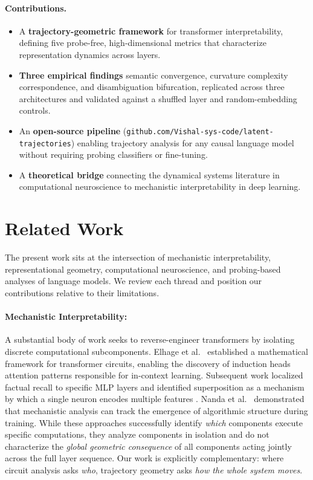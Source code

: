 \documentclass{article}
\begin{document}
\paragraph{Contributions.}
\begin{itemize}
    \item A \textbf{trajectory-geometric framework} for transformer 
    interpretability, defining five probe-free, high-dimensional metrics that 
    characterize representation dynamics across layers.
    
    \item \textbf{Three empirical findings} semantic convergence, 
    curvature complexity correspondence, and disambiguation bifurcation, replicated across three architectures and validated against a shuffled layer and random-embedding controls.
    
    \item An \textbf{open-source pipeline} (\texttt{github.com/Vishal-sys-code/latent-trajectories}) enabling trajectory analysis for any causal language model without requiring probing classifiers or fine-tuning.
    
    \item A \textbf{theoretical bridge} connecting the dynamical systems 
    literature in computational neuroscience to mechanistic interpretability 
    in deep learning.
\end{itemize}


\section{Related Work}
\label{sec:related_work}
The present work sits at the intersection of mechanistic interpretability, representational geometry, computational neuroscience, and probing-based analyses of language models. We review each thread and position our contributions relative to their limitations.

\paragraph{Mechanistic Interpretability:} A substantial body of work seeks to reverse-engineer transformers by isolating discrete computational subcomponents. Elhage et al.\ \cite{elhage2021mathematical} established a mathematical framework for transformer circuits, enabling the discovery of induction heads \cite{olsson2022incontext} attention patterns responsible for in-context learning. Subsequent work localized factual recall to specific MLP layers \cite{meng2022locating, geva2021transformer} and identified superposition as a mechanism by which a single neuron encodes multiple features \cite{elhage2022superposition}. Nanda et al.\ \cite{nanda2023progress} demonstrated that mechanistic analysis can track the emergence of algorithmic structure during training. While these approaches successfully identify \textit{which} components execute specific computations, they analyze components in isolation and do not characterize the \textit{global geometric consequence} of all components acting jointly across the full layer sequence. Our work is explicitly complementary: 
where circuit analysis asks \textit{who}, trajectory geometry asks \textit{how the whole system moves}.
\end{document}
